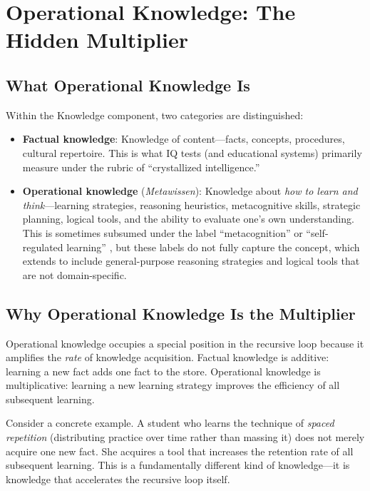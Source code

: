 \documentclass[12pt,a4paper]{article}
\begin{document}
\section{Operational Knowledge: The Hidden Multiplier}

\subsection{What Operational Knowledge Is}

Within the Knowledge component, two categories are distinguished:

\begin{itemize}
\item \textbf{Factual knowledge}: Knowledge of content---\hspace{0pt}facts, concepts, procedures, cultural repertoire. This is what IQ tests (and educational systems) primarily measure under the rubric of ``crystallized intelligence.''

\item \textbf{Operational knowledge} (\emph{Metawissen}): Knowledge about \emph{how to learn and think}---\hspace{0pt}learning strategies, reasoning heuristics, metacognitive skills, strategic planning, logical tools, and the ability to evaluate one's own understanding. This is sometimes subsumed under the label ``metacognition'' \citep{Flavell1979} or ``self-regulated learning'' \citep{Zimmerman2002}, but these labels do not fully capture the concept, which extends to include general-purpose reasoning strategies and logical tools that are not domain-specific.
\end{itemize}

\subsection{Why Operational Knowledge Is the Multiplier}

Operational knowledge occupies a special position in the recursive loop because it amplifies the \emph{rate} of knowledge acquisition. Factual knowledge is additive: learning a new fact adds one fact to the store. Operational knowledge is multiplicative: learning a new learning strategy improves the efficiency of all subsequent learning.

Consider a concrete example. A student who learns the technique of \emph{spaced repetition} (distributing practice over time rather than massing it) does not merely acquire one new fact. She acquires a tool that increases the retention rate of all subsequent learning. This is a fundamentally different kind of knowledge---\hspace{0pt}it is knowledge that accelerates the recursive loop itself.
\end{document}
